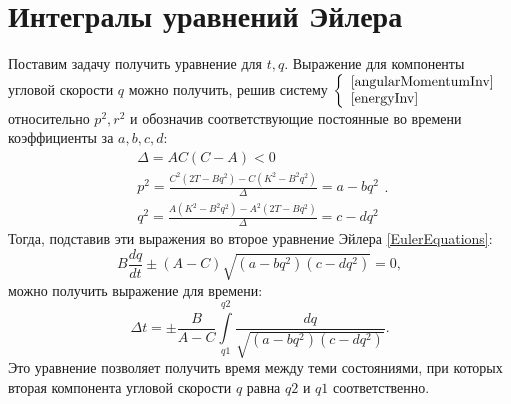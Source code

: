 \documentclass{article}
\begin{document}
\section{Интегралы уравнений Эйлера}
Поставим задачу получить уравнение для \begin{math} t, q \end{math}. 
Выражение для компоненты угловой скорости \begin{math} q \end{math} можно получить, решив систему
\begin{math}
\left\{
\begin{array}{l}
\ref{angularMomentumInv}\\
\ref{energyInv}
\end{array}
\right.
\end{math}
относительно \begin{math} p^2, r^2\end{math} и обозначив соответствующие постоянные во времени коэффициенты за \begin{math} a, b, c, d \end{math}:
\begin{equation}
\begin{array}{l}
\Delta=AC(C-A)<0\\
p^2=\frac{C^2(2T-Bq^2)-C(K^2-B^2q^2)}{\Delta}=a-bq^2\\
q^2=\frac{A(K^2-B^2q^2)-A^2(2T-Bq^2)}{\Delta}=c-dq^2
\end{array}.
\end{equation}
Тогда, подставив эти выражения во второе уравнение Эйлера \ref{EulerEquations}:
\begin{equation}
B\frac{dq}{dt}\pm(A-C)\sqrt{(a-bq^2)(c-dq^2)}=0,
\end{equation}
можно получить выражение для времени:
\begin{equation}
\Delta t=\pm\frac{B}{A-C}{\int\limits_{q1}^{q2}\frac{dq}{\sqrt{(a-bq^2)(c-dq^2)}}}.
\end{equation}
Это уравнение позволяет получить время между теми состояниями, при которых вторая компонента угловой скорости \begin{math} q \end{math} равна \begin{math} q2 \end{math} и \begin{math} q1 \end{math} соответственно.
\end{document}
